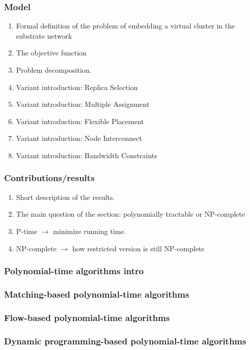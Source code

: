 \documentclass[a4paper]{article}
\begin{document}
\subsubsection{Model}
\begin{enumerate}
  \item Formal definition of the problem of embedding a virtual cluster in the substrate network
  \item The objective function
  \item Problem decomposition.
  \item Variant introduction: Replica Selection
  \item Variant introduction: Multiple Assignment
  \item Variant introduction: Flexible Placement
  \item Variant introduction: Node Interconnect
  \item Variant introduction: Bandwidth Constraints
\end{enumerate}
\subsubsection{Contributions/results}
\begin{enumerate}
  \item Short description of the results.
  \item The main question of the section: polynomially tractable or NP-complete
  \item P-time $\rightarrow$ minimize running time.
  \item NP-complete $\rightarrow$ how restricted version is still NP-complete
\end{enumerate}

\subsubsection{Polynomial-time algorithms intro}
\subsubsection{Matching-based polynomial-time algorithms}
\subsubsection{Flow-based polynomial-time algorithms}
\subsubsection{Dynamic programming-based polynomial-time algorithms}
\end{document}
